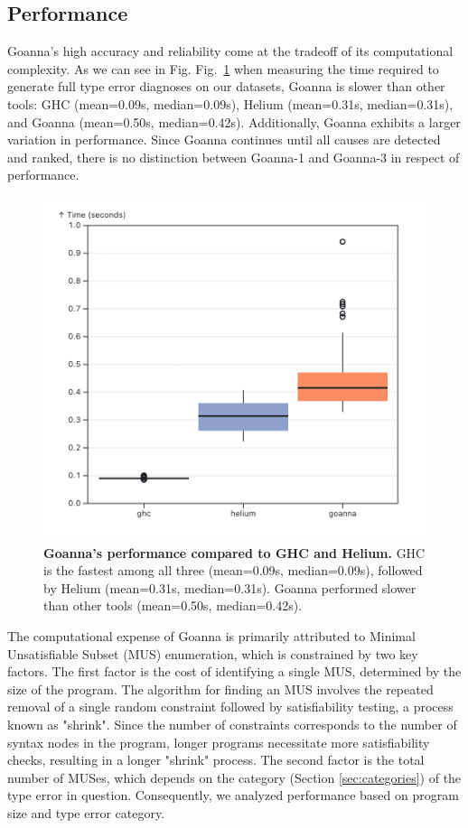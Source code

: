 \documentclass[pdflatex,lineno,sn-nature,Numbered]{sn-jnl}%
\begin{document}
\subsection{Performance} \label{sub:eval-performance}
Goanna's high accuracy and reliability come at the tradeoff of its computational complexity. As we can see in Fig. Fig.~\ref{fig:performance} when measuring the time required to generate full type error diagnoses on our datasets, Goanna is slower than other tools: GHC (mean=0.09s, median=0.09s), Helium (mean=0.31s, median=0.31s), and Goanna (mean=0.50s, median=0.42s). Additionally, Goanna exhibits a larger variation in performance. Since Goanna continues until all causes are detected and ranked, there is no distinction between Goanna-1 and Goanna-3 in respect of performance.

\begin{figure}[ht!]
    \centering
    \includegraphics[width=0.7\linewidth]{images/performance-overall.png}
    \caption{{\bf Goanna's performance compared to GHC and Helium.} GHC is the fastest among all three (mean=0.09s, median=0.09s), followed by Helium (mean=0.31s, median=0.31s). Goanna performed slower than other tools (mean=0.50s, median=0.42s).}
    \label{fig:performance}
\end{figure}

The computational expense of Goanna is primarily attributed to Minimal Unsatisfiable Subset (MUS) enumeration, which is constrained by two key factors. The first factor is the cost of identifying a single MUS, determined by the size of the program. The algorithm for finding an MUS involves the repeated removal of a single random constraint followed by satisfiability testing, a process known as "shrink". Since the number of constraints corresponds to the number of syntax nodes in the program, longer programs necessitate more satisfiability checks, resulting in a longer "shrink" process. The second factor is the total number of MUSes, which depends on the category (Section \ref{sec:categories}) of the type error in question. Consequently, we analyzed performance based on program size and type error category.
\end{document}
